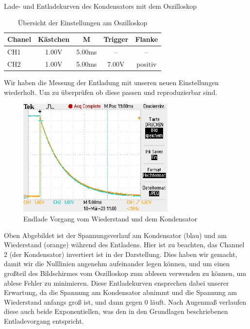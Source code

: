 \documentclass[twoside]{protokoll}
\begin{document}
\begin{aufgabe}{Lade- und Entladekurven des Kondensators mit dem Oszilloskop}
\begin{table}[H]
        \centering
        \begin{tabularx}{0.8\textwidth}{X c c c c} %
            \toprule
            \textbf{Chanel} & \textbf{Kästchen} & \textbf{M} & \textbf{Trigger} & \textbf{Flanke} \\
            \midrule
            CH1 & 1.00V & 5.00ms & -- & -- \\
            CH2 & 1.00V & 5.00ms & 7.00V & positiv \\
            \bottomrule
        \end{tabularx}
        \caption{Übersicht der Einstellungen am Oszilloskop}
        \label{tab:mytable}
    \end{table}

Wir haben die Messung der Entladung mit unseren neuen Einstellungen wiederholt. Um zu überprüfen ob diese passen und reproduzierbar sind.

 


\begin{figure}[H]
  \centering
    \includegraphics[width=0.7\textwidth]{Bilder_Osziloskop/Entladen_Kondensator_02.pdf}
    \caption{Endlade Vorgang vom Wiederstand und dem Kondensator}
  \centering
\end{figure}
Oben Abgebildet ist der Spannungsverlauf am Kondensator (blau) und am Wiederstand (orange) während des Entladens.
Hier ist zu beachten, das Channel 2 (der Kondensator) invertiert ist in der Darstellung.
Dies haben wir gemacht, damit wir die Nulllinien angenehm aufeinander legen können, und um einen großteil des Bildschirmes vom Oszilloskop zum ablesen verwenden zu können, um ablese Fehler zu minimieren.
Diese Entladekurven ensprechen dabei unserer Erwartung, da die Spannung am Kondensator abnimmt und die Spannung am Wiederstand anfangs groß ist, und dann gegen 0 läuft.
Nach Augenmaß verlaufen diese auch beide Exponentiellen, was den in den Grundlagen beschriebenen Entladevorgang entspricht.


\end{aufgabe}
\end{document}
